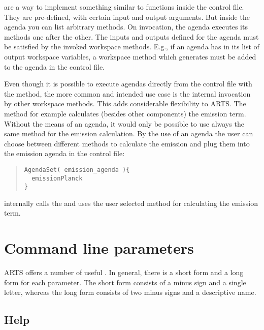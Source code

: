  are a way to implement something similar to
functions inside the control file. They are pre-defined, with certain
input and output arguments. But inside the agenda you can list
arbitrary methods. On invocation, the agenda executes its methods one
after the other. The inputs and outputs defined for the agenda must be
satisfied by the invoked workspace methods. E.g., if an agenda has
 in its list of output workspace variables, a
workspace method which generates  must be added to
the agenda in the control file.

Even though it is possible to execute agendas directly from the
control file with the  method, the more
common and intended use case is the internal invocation by other
workspace methods. This adds considerable flexibility to ARTS. The
 method for example calculates (besides other
components) the emission term. Without the means of an agenda, it
would only be possible to use always the same method for the emission
calculation. By the use of an agenda the user can choose between
different methods to calculate the emission and plug them into the
emission agenda in the control file:

\begin{quote}
\begin{verbatim}
AgendaSet( emission_agenda ){
  emissionPlanck
}
\end{verbatim}
\end{quote}

\noindent
{} internally calls the  and
uses the user selected method for calculating the emission term.


\section{Command line parameters}
\label{sec:concept:comline}

ARTS offers a number of useful . In
general, there is a short form and a long form for each parameter. The
short form consists of a minus sign and a single letter, whereas the
long form consists of two minus signs and a descriptive name.

\subsection*{Help}

